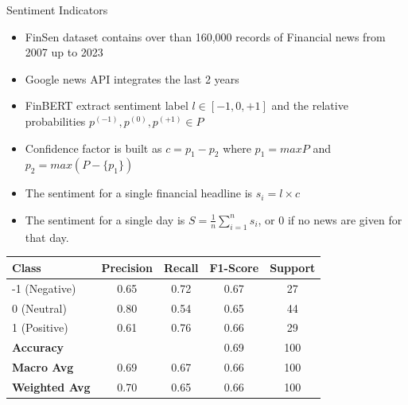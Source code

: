 \begin{frame}{Sentiment Indicators}
\begin{itemize}
    \item FinSen dataset contains over than 160,000 records of Financial news from 2007 up to 2023
    \item Google news API integrates the last 2 years 
    \item FinBERT extract sentiment label $l \in [-1, 0, +1]$ and the relative probabilities $p^{(-1)}, p^{(0)}, p^{(+1)} \in P$
    \item Confidence factor is built as $c = p_1 - p_2$ where $p_1 = max P $ and $p_2 = max (P - \{p_1\})$
    \item The sentiment for a single financial headline is $s_i = l \times c$
    \item The sentiment for a single day is $S =\frac{1}{n} \sum_{i=1}^n s_i $, or 0 if no news are given for that day.
\end{itemize}

\begin{table}[h!]
\centering
\begin{tabular}{lcccc}
\hline
\textbf{Class} & \textbf{Precision} & \textbf{Recall} & \textbf{F1-Score} & \textbf{Support} \\
\hline
-1 (Negative) & 0.65 & 0.72 & 0.67 & 27 \\
0 (Neutral)   & 0.80 & 0.54 & 0.65 & 44 \\
1 (Positive)  & 0.61 & 0.76 & 0.66 &  29\\
\hline
\textbf{Accuracy}    &      &      & 0.69 & 100 \\
\textbf{Macro Avg}   & 0.69 & 0.67 & 0.66 & 100 \\
\textbf{Weighted Avg}& 0.70 & 0.65 & 0.66 & 100 \\
\hline
\end{tabular}
\end{table}

\end{frame}
